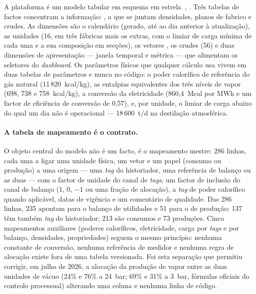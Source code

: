 A plataforma é um modelo tabular em esquema em
estrela~\cite{KimballRoss2013}, . Três tabelas de
factos concentram a informação: , a que se juntam densidades, planos
de fabrico e crudes. As dimensões são o calendário (gerado, até ao dia
anterior à atualização), as unidades (16, em três fábricas mais os
extras, com o limiar de carga mínima de cada uma e a sua composição em
secções), os vetores , os crudes
(56) e duas dimensões de apresentação --- janela temporal e métrica ---
que alimentam os seletores do \emph{dashboard}. Os parâmetros físicos que
qualquer cálculo usa vivem em duas tabelas de parâmetros e nunca no
código: o poder calorífico de referência do gás natural
(11\,820~kcal/kg), as entalpias equivalentes dos três níveis de vapor
(698, 738 e 758~kcal/kg), a conversão da eletricidade (860,4~Mcal por MWh e um
factor de eficiência de conversão de 0,57),  e, por unidade, o limiar
de carga abaixo do qual um dia não é operacional --- 18\,600~t/d na
destilação atmosférica.

\paragraph{A tabela de mapeamento é o contrato.} O objeto central do
modelo não é um facto, é o mapeamento mestre: 286 linhas, cada uma a
ligar uma unidade física, um vetor e um papel (consumo ou produção) a
uma origem --- uma \emph{tag} do historiador, uma referência de balanço
ou as duas --- com o factor de unidade do canal de \emph{tags}, um factor
de inclusão do canal de balanço (1, 0, $-1$ ou uma fração de alocação),
a \emph{tag} de poder calorífico quando aplicável, datas de vigência e um
comentário de qualidade. Das 286 linhas, 235 apontam para o balanço de
utilidades e 51 para o de produção; 137 têm também \emph{tag} do
historiador; 213 são consumos e 73 produções. Cinco mapeamentos auxiliares
(poderes caloríficos, eletricidade, carga por \emph{tags} e por balanço,
densidades, propriedades) seguem o mesmo princípio: nenhuma constante de
conversão, nenhuma referência de medidor e nenhuma regra de alocação
existe fora de uma tabela versionada. Foi esta separação que permitiu
corrigir, em julho de 2026, a alocação da produção de vapor entre as duas
unidades de vácuo (24\% e 76\% a 24~bar; 69\% e 31\% a 3~bar, fórmulas
oficiais do controlo processual) alterando uma coluna e nenhuma linha de
código.

